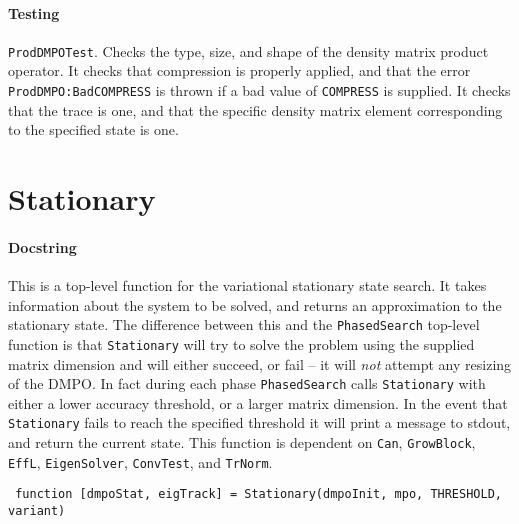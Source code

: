  \paragraph{Testing} \lstinline$ProdDMPOTest$. Checks the type, size, and shape of the density matrix product operator. It checks that compression is properly applied, and that the error \lstinline$ProdDMPO:BadCOMPRESS$ is thrown if a bad value of \lstinline$COMPRESS$ is supplied. It checks that the trace is one, and that the specific density matrix element corresponding to the specified state is one.

 \section{Stationary}
 \paragraph{Docstring} This is a top-level function for the variational stationary state search. It takes information about the system to be solved, and returns an approximation to the stationary state. The difference between this and the \lstinline$PhasedSearch$ top-level function is that \lstinline$Stationary$ will try to solve the problem using the supplied matrix dimension and will either succeed, or fail -- it will \emph{not} attempt any resizing of the DMPO. In fact during each phase \lstinline$PhasedSearch$ calls \lstinline$Stationary$ with either a lower accuracy threshold, or a larger matrix dimension. In the event that \lstinline$Stationary$ fails to reach the specified threshold it will print a message to stdout, and return the current state. This function is dependent on \lstinline$Can$, \lstinline$GrowBlock$, \lstinline$EffL$, \lstinline$EigenSolver$, \lstinline$ConvTest$, and \lstinline$TrNorm$.
 \begin{lstlisting}
 function [dmpoStat, eigTrack] = Stationary(dmpoInit, mpo, THRESHOLD, variant) \end{lstlisting}
